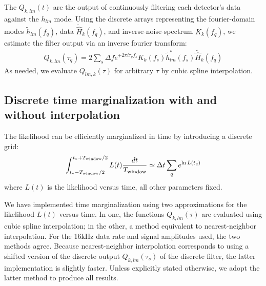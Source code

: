 The $Q_{k,lm}(t)$ are the output of continuously filtering each detector's data against the $h_{lm}$ mode.  Using the
discrete arrays representing the fourier-domain modes $\tilde{h}_{lm}(f_q)$, data $\tilde{\hat{H}}_k(f_q)$, and inverse-noise-spectrum  $K_k(f_q)$, we estimate the
filter output via an inverse fourier transform:
\begin{eqnarray}
Q_{k,lm}(\tau_q) = 2 \sum_s \Delta f e^{+2\pi i \tau_q f_s} K_k(f_s) \tilde{h}^*_{lm}(f_s) \tilde{\hat{H}}_k(f_q)
\end{eqnarray}
%
As needed, we evaluate $Q_{lm,k}(\tau)$ for arbitrary $\tau$ by  cubic spline interpolation.  




\subsection{Discrete time marginalization with and without interpolation}

The likelihood can be efficiently marginalized in time by introducing a discrete grid:
\begin{eqnarray}
\int_{t_*-T_{\rm window}/2 }^{t_*+T_{\rm window}/2}L(t) \frac{dt}{T_{\rm window}} \simeq \Delta t \sum_q e^{\ln L(t_q)}
\end{eqnarray}
where $L(t) $ is the likelihood versus time, all other parameters fixed.   
%

We have implemented time marginalization using two approximations for the likelihood $L(t)$ versus time.  In one,  the  functions
$Q_{k,lm}(\tau)$ are evaluated using cubic spline interpolation; in the other, a method equivalent to nearest-neighbor interpolation.  For
the 16kHz data rate and signal amplitudes used, the two methods agree.   Because nearest-neighbor interpolation
corresponds to using a shifted version of the  discrete output $Q_{k,lm}(\tau_s)$ of the discrete filter, the latter
implementation is slightly faster.   
%
Unless explicitly stated otherwise, we adopt the latter method to produce all results.  
